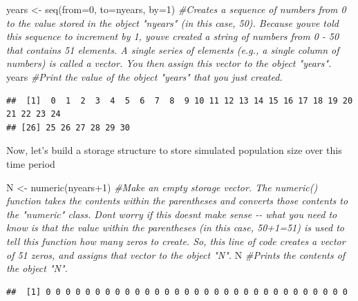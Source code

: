 \documentclass[
]{article}
\newenvironment{Shaded}{\begin{snugshade}}{\end{snugshade}}
\newcommand{\AttributeTok}[1]{\textcolor[rgb]{0.77,0.63,0.00}{#1}}
\newcommand{\CommentTok}[1]{\textcolor[rgb]{0.56,0.35,0.01}{\textit{#1}}}
\newcommand{\DecValTok}[1]{\textcolor[rgb]{0.00,0.00,0.81}{#1}}
\newcommand{\FunctionTok}[1]{\textcolor[rgb]{0.00,0.00,0.00}{#1}}
\newcommand{\NormalTok}[1]{#1}
\newcommand{\OtherTok}[1]{\textcolor[rgb]{0.56,0.35,0.01}{#1}}
\newcommand{\SpecialCharTok}[1]{\textcolor[rgb]{0.00,0.00,0.00}{#1}}
\begin{document}
\begin{Shaded}
\begin{Highlighting}[]
\NormalTok{years }\OtherTok{\textless{}{-}} \FunctionTok{seq}\NormalTok{(}\AttributeTok{from=}\DecValTok{0}\NormalTok{, }\AttributeTok{to=}\NormalTok{nyears, }\AttributeTok{by=}\DecValTok{1}\NormalTok{)   }\CommentTok{\#Creates a sequence of numbers from 0 to the value stored in the object "nyears" (in this case, 50). Because you\textquotesingle{}ve told this sequence to increment by 1, you\textquotesingle{}ve created a string of numbers from 0 {-} 50 that contains 51 elements. A single series of elements (e.g., a single column of numbers) is called a vector. You then assign this vector to the object "years".}
\NormalTok{years                                   }\CommentTok{\#Print the value of the object "years" that you just created.}
\end{Highlighting}
\end{Shaded}

\begin{verbatim}
##  [1]  0  1  2  3  4  5  6  7  8  9 10 11 12 13 14 15 16 17 18 19 20 21 22 23 24
## [26] 25 26 27 28 29 30
\end{verbatim}

Now, let's build a storage structure to store simulated population size
over this time period

\begin{Shaded}
\begin{Highlighting}[]
\NormalTok{N }\OtherTok{\textless{}{-}} \FunctionTok{numeric}\NormalTok{(nyears}\SpecialCharTok{+}\DecValTok{1}\NormalTok{)    }\CommentTok{\#Make an empty storage vector. The numeric() function takes the contents within the parentheses and converts those contents to the "numeric" class. Don\textquotesingle{}t worry if this doesn\textquotesingle{}t make sense {-}{-} what you need to know is that the value within the parentheses (in this case, 50+1=51) is used to tell this function how many zeros to create. So, this line of code creates a vector of 51 zeros, and assigns that vector to the object "N".}
\NormalTok{N                         }\CommentTok{\#Prints the contents of the object "N".}
\end{Highlighting}
\end{Shaded}

\begin{verbatim}
##  [1] 0 0 0 0 0 0 0 0 0 0 0 0 0 0 0 0 0 0 0 0 0 0 0 0 0 0 0 0 0 0 0
\end{verbatim}
\end{document}
